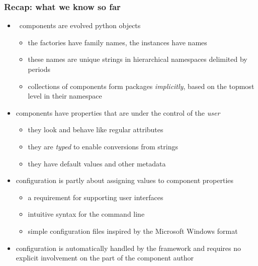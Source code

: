 %
%


\begin{frame}[fragile]
%
  \frametitle{Recap: what we know so far}
%
  \begin{itemize}
%
  \item \pyre\ components are evolved python objects
    \begin{itemize}
    \item the factories have family names, the instances have names
    \item these names are unique strings in hierarchical namespaces delimited by periods
    \item collections of components form packages \emph{implicitly}, based on the topmost level
      in their namespace
    \end{itemize}
%
  \item components have properties that are under the control of the \emph{user}
    \begin{itemize}
    \item they look and behave like regular attributes
    \item they are \emph{typed} to enable conversions from strings
    \item they have default values and other metadata
    \end{itemize}
%
  \item configuration is partly about assigning values to component properties
    \begin{itemize}
    \item a requirement for supporting user interfaces
    \item intuitive syntax for the command line
    \item simple configuration files inspired by the Microsoft Windows  format
    \end{itemize}
%
  \item configuration is automatically handled by the framework and requires no explicit
    involvement on the part of the component author
%
  \end{itemize}
%
\end{frame}

